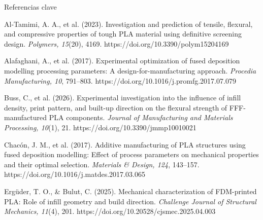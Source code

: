 \documentclass[24pt]{extarticle}
\begin{document}
\begin{bloque}{Referencias clave}
\raggedright\fontsize{20}{23}\selectfont\setlength{\parskip}{4pt}
\begin{minipage}[t]{0.485\linewidth}\vspace{0pt}
Al-Tamimi, A. A., et al. (2023). Investigation and prediction of tensile, flexural, and compressive properties of tough PLA material using definitive screening design. \textit{Polymers, 15}(20), 4169. https://doi.org/10.3390/polym15204169\par
Alafaghani, A., et al. (2017). Experimental optimization of fused deposition modelling processing parameters: A design-for-manufacturing approach. \textit{Procedia Manufacturing, 10}, 791--803. https://doi.org/10.1016/j.promfg.2017.07.079\par
Buss, C., et al. (2026). Experimental investigation into the influence of infill density, print pattern, and built-up direction on the flexural strength of FFF-manufactured PLA components. \textit{Journal of Manufacturing and Materials Processing, 10}(1), 21. https://doi.org/10.3390/jmmp10010021\par
\end{minipage}\hfill
\begin{minipage}[t]{0.485\linewidth}\vspace{0pt}
Chacón, J. M., et al. (2017). Additive manufacturing of PLA structures using fused deposition modelling: Effect of process parameters on mechanical properties and their optimal selection. \textit{Materials \& Design, 124}, 143--157. https://doi.org/10.1016/j.matdes.2017.03.065\par
Ergüder, T. O., \& Bulut, C. (2025). Mechanical characterization of FDM-printed PLA: Role of infill geometry and build direction. \textit{Challenge Journal of Structural Mechanics, 11}(4), 201. https://doi.org/10.20528/cjsmec.2025.04.003\par
\end{minipage}
\end{bloque}
\end{document}
